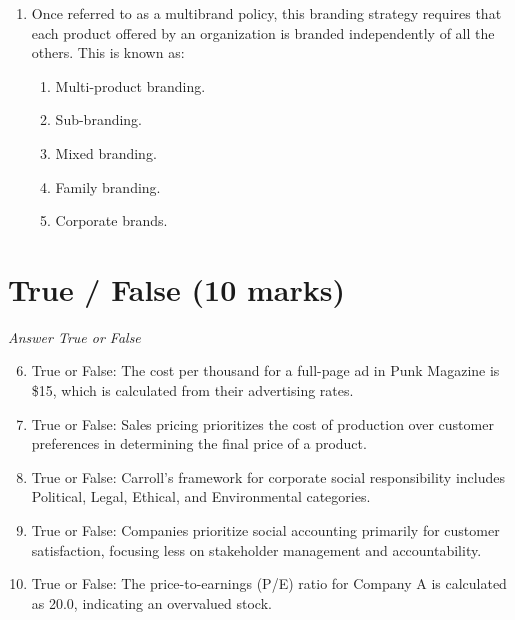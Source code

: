 \documentclass[12pt]{article}
\begin{document}
\begin{enumerate}[label=\arabic*.]
\begin{enumerate}[label=(\alph*)]
    \item 19.00
    \item 20.35
    \item 25.40
    \item 23.50
    \item 24.75
\end{enumerate}
\item Once referred to as a multibrand policy, this branding strategy requires that each product offered by an organization is branded independently of all the others. This is known as:
\begin{enumerate}[label=(\alph*)]
    \item Multi-product branding.
    \item Sub-branding.
    \item Mixed branding.
    \item Family branding.
    \item Corporate brands.
\end{enumerate}
\end{enumerate}

\section*{True / False (10 marks)}
\textit{Answer True or False}
\begin{enumerate}[label=\arabic*.]
\setcounter{enumi}{5}
\item True or False: The cost per thousand for a full-page ad in Punk Magazine is \$15, which is calculated from their advertising rates.
\item True or False: Sales pricing prioritizes the cost of production over customer preferences in determining the final price of a product.
\item True or False: Carroll's framework for corporate social responsibility includes Political, Legal, Ethical, and Environmental categories.
\item True or False: Companies prioritize social accounting primarily for customer satisfaction, focusing less on stakeholder management and accountability.
\item True or False: The price-to-earnings (P/E) ratio for Company A is calculated as 20.0, indicating an overvalued stock.
\end{enumerate}
\end{document}
